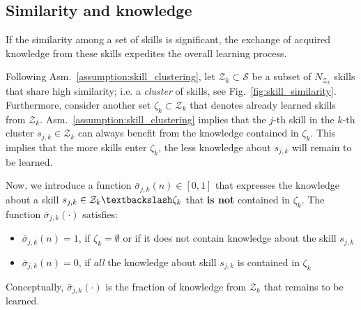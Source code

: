 \subsection{Similarity and knowledge}
\begin{tcolorbox}
	\begin{assumption}\label{assumption:skill_clustering} If the similarity among a set of skills is significant, the exchange of acquired knowledge from these skills expedites the overall learning process.
		\end{assumption}
\end{tcolorbox}
Following Asm.~\ref{assumption:skill_clustering}, let $\mathcal{Z}_k \subset \mathcal{S}$ be a subset of $N_{\mathcal{Z}_k}$ skills that share high similarity; i.e. a \emph{cluster} of skills, see Fig.~\ref{fig:skill_similarity}. Furthermore, consider another set $\mathcal{\zeta}_k \subset \mathcal{Z}_k$ that denotes already learned skills from $\mathcal{Z}_k$. Asm.~\ref{assumption:skill_clustering} implies that the $j$-th skill in the $k$-th cluster $s_{j,k} \in \mathcal{Z}_k$ can always benefit from the knowledge contained in $\mathcal{\zeta}_k$. This implies that the more skills enter $\mathcal{\zeta}_k$, the less knowledge about $ s_{j,k} $ will remain to be learned.

Now, we introduce a function $\bar{\sigma}_{j,k}\left(n\right)\in [0,1]$ that expresses the knowledge about a skill $s_{j,k} \in \mathcal{Z}_k\textbackslash \mathcal{\zeta}_k$ that \textbf{is not} contained in $\mathcal{\zeta}_k$. The function $\bar{\sigma}_{j,k}(\cdot)$ satisfies:
\begin{itemize}
	\item $\bar{\sigma}_{j,k}\left(n\right) = 1$, if $\mathcal{\zeta}_k=\emptyset$ or if it does not contain knowledge about the skill $s_{j,k}$
	\item $\bar{\sigma}_{j,k}\left(n\right) = 0$, if \emph{all} the knowledge about skill $s_{j,k}$ is contained in $\mathcal{\zeta}_k$
\end{itemize} 
Conceptually, $\bar{\sigma}_ {j,k}\left(\cdot\right)$ is the fraction of knowledge from ${\mathcal{Z}_k}$ that remains to be learned.

